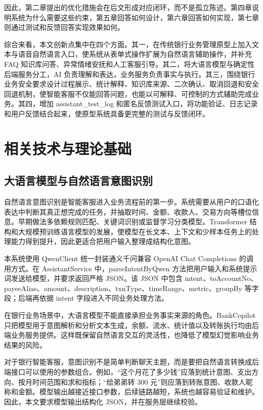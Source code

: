 \documentclass[bachelor, print]{xduthesis}
\begin{document}
因此，第二章提出的优化措施会在后文形成对应闭环，而不是孤立陈述。第四章说明系统为什么需要这些约束，第五章回答如何设计，第六章回答如何实现，第七章则通过测试和反馈回答实现效果如何。

综合来看，本文创新点集中在四个方面。其一，在传统银行业务管理原型上加入文本与语音自然语言入口，使系统从表单式操作扩展为自然语言辅助操作，并补充 FAQ 知识库问答、异常情绪安抚和人工客服引导。其二，将大语言模型与确定性后端服务分工，AI 负责理解和表达，业务服务负责事实与执行。其三，围绕银行业务安全要求设计过程展示、统计解释、知识库来源、二次确认、取消回退和安全回退机制，使智能客服不仅能回答问题，也能以可解释、可控制的方式辅助完成业务。其四，增加 assistant\_test\_log 和匿名反馈测试入口，将功能验证、日志记录和用户反馈结合起来，使原型系统具备更完整的测试与反馈闭环。

\chapter{相关技术与理论基础}

\section{大语言模型与自然语言意图识别}

自然语言意图识别是智能客服进入业务流程前的第一步。系统需要从用户的口语化表达中判断其真正想完成的任务，并抽取时间、金额、收款人、交易方向等槽位信息。早期做法多依赖规则匹配、关键词识别或监督学习分类模型。Transformer 结构和大规模预训练语言模型的发展，使模型在长文本、上下文和少样本任务上的处理能力得到提升\cite{vaswani2017attention,brown2020language}，因此更适合把用户输入整理成结构化意图。

本系统使用 QwenClient 统一封装通义千问兼容 OpenAI Chat Completions 的调用方式\cite{dashscope}。在 AssistantService 中，parseIntentByQwen 方法把用户输入和系统提示词发送给模型，并要求返回严格 JSON。该 JSON 中包含 intent、toAccountNo、payeeAlias、amount、description、txnType、timeRange、metric、groupBy 等字段；后端再依据 intent 字段进入不同业务处理方法。

在银行业务场景中，大语言模型不能直接承担业务事实来源的角色。BankCopilot 只把模型用于意图解析和分析文本生成，余额、流水、统计值以及转账执行均由后端业务服务提供。这样既保留自然语言交互的灵活性，也降低了模型幻觉影响业务结果的风险。

对于银行智能客服，意图识别不是简单判断聊天主题，而是要把自然语言转换成后端接口可以使用的参数组合。例如，“这个月花了多少钱”应落到统计意图、支出方向、按月时间范围和求和指标；“给弟弟转 300 元”则应落到转账意图、收款人昵称和金额。模型输出越接近接口参数，后续链路越短，系统也越容易验证和维护。因此，本文要求模型输出结构化 JSON，并在服务层继续校验。
\end{document}
